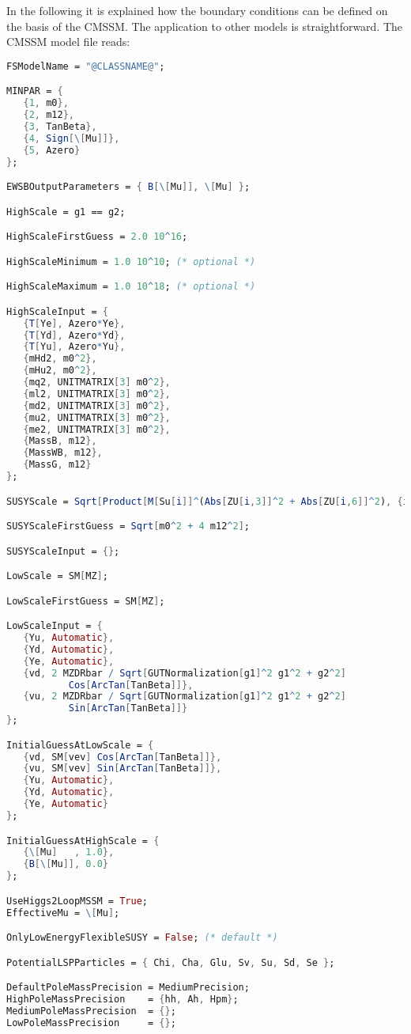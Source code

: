 \documentclass[final,3p,11pt,pdflatex]{elsarticle}
\begin{document}
In the following it is explained how the
boundary conditions can be defined on the basis of the CMSSM.  The
application to other models is straightforward.  The CMSSM model file
reads:
%
\begin{lstlisting}[language=Mathematica]
FSModelName = "@CLASSNAME@";

MINPAR = {
   {1, m0},
   {2, m12},
   {3, TanBeta},
   {4, Sign[\[Mu]]},
   {5, Azero}
};

EWSBOutputParameters = { B[\[Mu]], \[Mu] };

HighScale = g1 == g2;

HighScaleFirstGuess = 2.0 10^16;

HighScaleMinimum = 1.0 10^10; (* optional *)

HighScaleMaximum = 1.0 10^18; (* optional *)

HighScaleInput = {
   {T[Ye], Azero*Ye},
   {T[Yd], Azero*Yd},
   {T[Yu], Azero*Yu},
   {mHd2, m0^2},
   {mHu2, m0^2},
   {mq2, UNITMATRIX[3] m0^2},
   {ml2, UNITMATRIX[3] m0^2},
   {md2, UNITMATRIX[3] m0^2},
   {mu2, UNITMATRIX[3] m0^2},
   {me2, UNITMATRIX[3] m0^2},
   {MassB, m12},
   {MassWB, m12},
   {MassG, m12}
};

SUSYScale = Sqrt[Product[M[Su[i]]^(Abs[ZU[i,3]]^2 + Abs[ZU[i,6]]^2), {i,6}]];

SUSYScaleFirstGuess = Sqrt[m0^2 + 4 m12^2];

SUSYScaleInput = {};

LowScale = SM[MZ];

LowScaleFirstGuess = SM[MZ];

LowScaleInput = {
   {Yu, Automatic},
   {Yd, Automatic},
   {Ye, Automatic},
   {vd, 2 MZDRbar / Sqrt[GUTNormalization[g1]^2 g1^2 + g2^2]
           Cos[ArcTan[TanBeta]]},
   {vu, 2 MZDRbar / Sqrt[GUTNormalization[g1]^2 g1^2 + g2^2]
           Sin[ArcTan[TanBeta]]}
};

InitialGuessAtLowScale = {
   {vd, SM[vev] Cos[ArcTan[TanBeta]]},
   {vu, SM[vev] Sin[ArcTan[TanBeta]]},
   {Yu, Automatic},
   {Yd, Automatic},
   {Ye, Automatic}
};

InitialGuessAtHighScale = {
   {\[Mu]   , 1.0},
   {B[\[Mu]], 0.0}
};

UseHiggs2LoopMSSM = True;
EffectiveMu = \[Mu];

OnlyLowEnergyFlexibleSUSY = False; (* default *)

PotentialLSPParticles = { Chi, Cha, Glu, Sv, Su, Sd, Se };

DefaultPoleMassPrecision = MediumPrecision;
HighPoleMassPrecision    = {hh, Ah, Hpm};
MediumPoleMassPrecision  = {};
LowPoleMassPrecision     = {};


\end{lstlisting}
\end{document}
